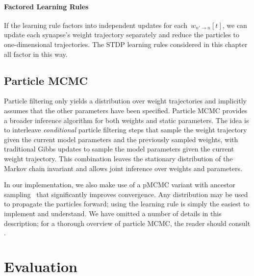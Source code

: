 \paragraph{Factored Learning Rules}
If the learning rule factors into
independent updates for each~$w_{n' \to n}[t]$, we can update
each synapse's weight trajectory separately and reduce the particles
to one-dimensional trajectories. The STDP learning rules considered 
in this chapter all factor in this way. 


\subsection{Particle MCMC}
Particle filtering only yields a distribution over weight
trajectories and implicitly assumes that the other parameters have
been specified. Particle MCMC provides a broader inference algorithm
for both weights and static parameters. The idea is to interleave
\emph{conditional} particle filtering steps that sample the weight
trajectory given the current model parameters and the previously
sampled weights, with traditional Gibbs updates to sample the model
parameters given the current weight trajectory. This combination
leaves the stationary distribution of the Markov chain invariant and
allows joint inference over weights and parameters.  

In our implementation, we also make use of
a pMCMC variant with ancestor sampling~\citep{Lindsten-2012} that
significantly improves convergence. Any distribution may be used to
propagate the particles forward; using the learning rule is simply the
easiest to implement and understand.  We have omitted a number of
details in this description; for a thorough overview of particle MCMC,
the reader should consult \citep{Andrieu-2010, Lindsten-2012}.



\section{Evaluation}

